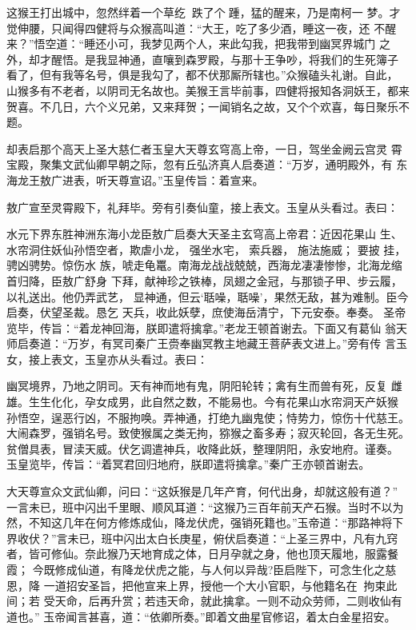 这猴王打出城中，忽然绊着一个草纥，跌了个踵，猛的醒来，乃是南柯一
梦。才觉伸腰，只闻得四健将与众猴高叫道：“大王，吃了多少酒，睡这一夜，还
不醒来？”悟空道：“睡还小可，我梦见两个人，来此勾我，把我带到幽冥界城门
之外，却才醒悟。是我显神通，直嚷到森罗殿，与那十王争吵，将我们的生死簿子
看了，但有我等名号，俱是我勾了，都不伏那厮所辖也。”众猴磕头礼谢。自此，
山猴多有不老者，以阴司无名故也。美猴王言毕前事，四健将报知各洞妖王，都来
贺喜。不几日，六个义兄弟，又来拜贺；一闻销名之故，又个个欢喜，每日聚乐不
题。

却表启那个高天上圣大慈仁者玉皇大天尊玄穹高上帝，一日，驾坐金阙云宫灵
霄宝殿，聚集文武仙卿早朝之际，忽有丘弘济真人启奏道：“万岁，通明殿外，有
东海龙王敖广进表，听天尊宣诏。”玉皇传旨：着宣来。

敖广宣至灵霄殿下，礼拜毕。旁有引奏仙童，接上表文。玉皇从头看过。表曰：

水元下界东胜神洲东海小龙臣敖广启奏大天圣主玄穹高上帝君：近因花果山
生、水帘洞住妖仙孙悟空者，欺虐小龙， 强坐水宅， 索兵器， 施法施威； 要披
挂， 骋凶骋势。惊伤水
族，唬走龟鼍。南海龙战战兢兢，西海龙凄凄惨惨，北海龙缩首归降，臣敖广舒身
下拜，献神珍之铁棒，凤翅之金冠，与那锁子甲、步云履，以礼送出。他仍弄武艺，
显神通，但云‘聒噪，聒噪’，果然无敌，甚为难制。臣今启奏，伏望圣裁。恳乞
天兵，收此妖孽，庶使海岳清宁，下元安泰。奉奏。
圣帝览毕，传旨：“着龙神回海，朕即遣将擒拿。”老龙王顿首谢去。下面又有葛仙
翁天师启奏道：“万岁，有冥司秦广王赍奉幽冥教主地藏王菩萨表文进上。”旁有传
言玉女，接上表文，玉皇亦从头看过。表曰：

幽冥境界，乃地之阴司。天有神而地有鬼，阴阳轮转；禽有生而兽有死，反复
雌雄。生生化化，孕女成男，此自然之数，不能易也。今有花果山水帘洞天产妖猴
孙悟空，逞恶行凶，不服拘唤。弄神通，打绝九幽鬼使；恃势力，惊伤十代慈王。
大闹森罗，强销名号。致使猴属之类无拘，猕猴之畜多寿；寂灭轮回，各无生死。
贫僧具表，冒渎天威。伏乞调遣神兵，收降此妖，整理阴阳，永安地府。谨奏。
玉皇览毕，传旨：“着冥君回归地府，朕即遣将擒拿。”秦广王亦顿首谢去。

大天尊宣众文武仙卿，问曰：“这妖猴是几年产育，何代出身，却就这般有道？”
一言未已，班中闪出千里眼、顺风耳道：“这猴乃三百年前天产石猴。当时不以为
然，不知这几年在何方修炼成仙，降龙伏虎，强销死籍也。”玉帝道：“那路神将下
界收伏？”言未已，班中闪出太白长庚星，俯伏启奏道：“上圣三界中，凡有九窍
者，皆可修仙。奈此猴乃天地育成之体，日月孕就之身，他也顶天履地，服露餐霞；
今既修成仙道，有降龙伏虎之能，与人何以异哉?臣启陛下，可念生化之慈恩，降
一道招安圣旨，把他宣来上界，授他一个大小官职，与他籍名在，拘束此间；若
受天命，后再升赏；若违天命，就此擒拿。一则不动众劳师，二则收仙有道也。”
玉帝闻言甚喜，道：“依卿所奏。”即着文曲星官修诏，着太白金星招安。

